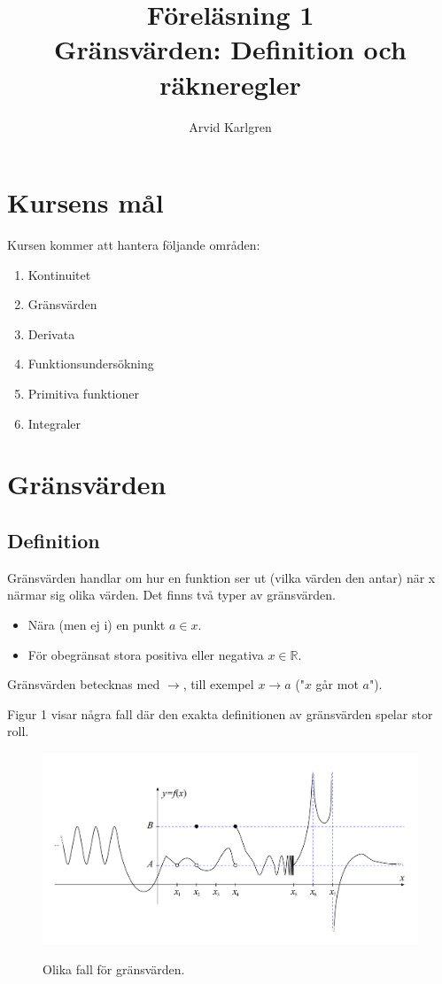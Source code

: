 \documentclass[swedish]{article}
\author{Arvid Karlgren}
\title{Föreläsning 1\\
       \LARGE Gränsvärden: Definition och räkneregler}
\begin{document}
\maketitle

\tableofcontents

\pagebreak

\section{Kursens mål}

Kursen kommer att hantera följande områden:

\begin{enumerate}
    \item Kontinuitet
    \item Gränsvärden
    \item Derivata
    \item Funktionsundersökning
    \item Primitiva funktioner
    \item Integraler
\end{enumerate}

\pagebreak

\section{Gränsvärden}

\subsection{Definition}

Gränsvärden handlar om hur en funktion ser ut (vilka värden den antar) när x närmar sig olika värden. Det finns två typer av gränsvärden.

\begin{itemize}
    \item{Nära (men ej i) en punkt $a\in x$.}
    \item{För obegränsat stora positiva eller negativa $x\in \mathbb{R}$.}
\end{itemize}

Gränsvärden betecknas med $\to$, till exempel $x \to a$ ("$x$ går mot $a$").

Figur 1 visar några fall där den exakta definitionen av gränsvärden spelar stor roll. 

\begin{figure}[h!]
    \includegraphics[width=\linewidth]{figur1.png}
    \label{fig:figur1}
    \caption{Olika fall för gränsvärden.}
\end{figure}
\end{document}
